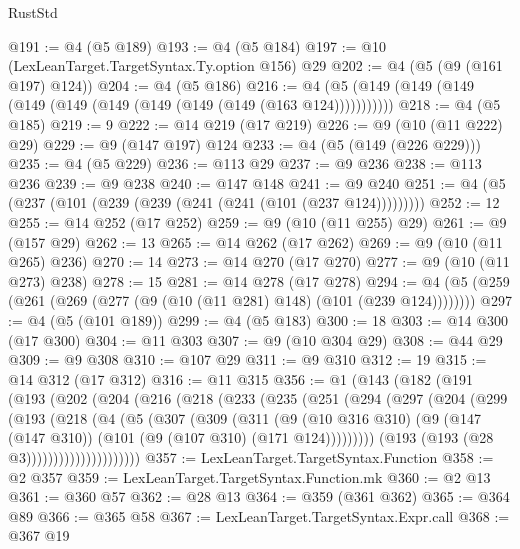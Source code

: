 \begin{lexlean}{RustStd}
\begin{coremodule}
@191 := @4 (@5 @189)
@193 := @4 (@5 @184)
@197 := @10 (LexLeanTarget.TargetSyntax.Ty.option @156) @29
@202 := @4 (@5 (@9 (@161 @197) @124))
@204 := @4 (@5 @186)
@216 := @4 (@5 (@149 (@149 (@149 (@149 (@149 (@149 (@149 (@149 (@149 (@163 @124)))))))))))
@218 := @4 (@5 @185)
@219 := 9
@222 := @14 @219 (@17 @219)
@226 := @9 (@10 (@11 @222) @29)
@229 := @9 (@147 @197) @124
@233 := @4 (@5 (@149 (@226 @229)))
@235 := @4 (@5 @229)
@236 := @113 @29
@237 := @9 @236
@238 := @113 @236
@239 := @9 @238
@240 := @147 @148
@241 := @9 @240
@251 := @4 (@5 (@237 (@101 (@239 (@239 (@241 (@241 (@101 (@237 @124)))))))))
@252 := 12
@255 := @14 @252 (@17 @252)
@259 := @9 (@10 (@11 @255) @29)
@261 := @9 (@157 @29)
@262 := 13
@265 := @14 @262 (@17 @262)
@269 := @9 (@10 (@11 @265) @236)
@270 := 14
@273 := @14 @270 (@17 @270)
@277 := @9 (@10 (@11 @273) @238)
@278 := 15
@281 := @14 @278 (@17 @278)
@294 := @4 (@5 (@259 (@261 (@269 (@277 (@9 (@10 (@11 @281) @148) (@101 (@239 @124))))))))
@297 := @4 (@5 (@101 @189))
@299 := @4 (@5 @183)
@300 := 18
@303 := @14 @300 (@17 @300)
@304 := @11 @303
@307 := @9 (@10 @304 @29)
@308 := @44 @29
@309 := @9 @308
@310 := @107 @29
@311 := @9 @310
@312 := 19
@315 := @14 @312 (@17 @312)
@316 := @11 @315
@356 := @1
    (@143
      (@182
        (@191
          (@193
            (@202
              (@204
                (@216
                  (@218
                    (@233
                      (@235
                        (@251
                          (@294
                            (@297
                              (@204
                                (@299
                                  (@193
                                    (@218
                                      (@4
                                        (@5
                                          (@307
                                            (@309
                                              (@311
                                                (@9
                                                  (@10 @316 @310)
                                                  (@9
                                                    (@147 (@147 @310))
                                                    (@101 (@9 (@107 @310) (@171 @124)))))))))
                                        (@193 (@193 (@28 @3)))))))))))))))))))))
@357 := LexLeanTarget.TargetSyntax.Function
@358 := @2 @357
@359 := LexLeanTarget.TargetSyntax.Function.mk
@360 := @2 @13
@361 := @360 @57
@362 := @28 @13
@364 := @359 (@361 @362)
@365 := @364 @89
@366 := @365 @58
@367 := LexLeanTarget.TargetSyntax.Expr.call
@368 := @367 @19

\end{coremodule}
\end{lexlean}
